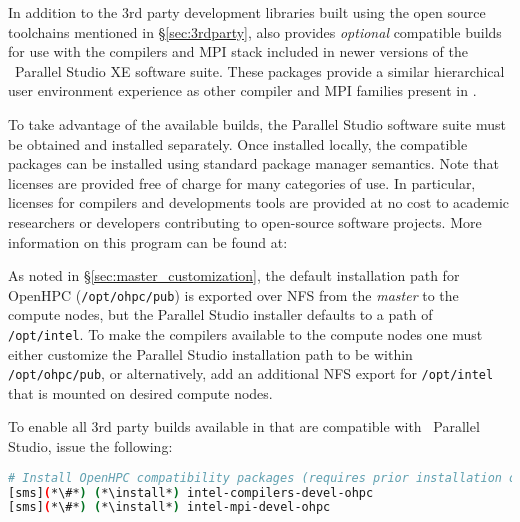 In addition to the 3rd party development libraries built using the open source
toolchains mentioned in \S\ref{sec:3rdparty}, \OHPC{} also provides {\em
  optional} compatible builds for use with the compilers and MPI stack included
in newer versions of the \IntelR{}~Parallel Studio XE software suite.  These
packages provide a similar hierarchical user
environment experience as other compiler and MPI families present in \OHPC{}.

To take advantage of the available builds, the Parallel Studio software suite
must be obtained and installed separately. Once installed locally, the \OHPC{}
compatible packages can be installed using standard package manager semantics.
Note that licenses are provided free of charge for many categories of use. In
particular, licenses for compilers and developments tools are provided at no
cost to academic researchers or developers contributing to open-source software
projects. More information on this program can be found at:

\begin{center}
  \href{https://software.intel.com/en-us/qualify-for-free-software}
       {\color{blue}{https://software.intel.com/en-us/qualify-for-free-software}}
\end{center}

\begin{center}
\begin{tcolorbox}[]
As noted in \S\ref{sec:master_customization}, the default installation path for
OpenHPC (\texttt{/opt/ohpc/pub}) is exported over NFS from the {\em master} to the 
compute nodes, but the Parallel Studio installer defaults to a path of 
\texttt{/opt/intel}. To make the \IntelR{} compilers available to the compute 
nodes one must either customize the Parallel Studio installation path to be 
within \texttt{/opt/ohpc/pub}, or alternatively, add an additional NFS export
for \texttt{/opt/intel} that is mounted on desired compute nodes.
\end{tcolorbox}
\end{center}

\noindent To enable all 3rd party builds available in \OHPC{} that are compatible with
\IntelR{}~Parallel Studio, issue the following:

\begin{lstlisting}[language=bash,keywords={},upquote=true,keepspaces]
# Install OpenHPC compatibility packages (requires prior installation of Parallel Studio)
[sms](*\#*) (*\install*) intel-compilers-devel-ohpc
[sms](*\#*) (*\install*) intel-mpi-devel-ohpc
\end{lstlisting}

